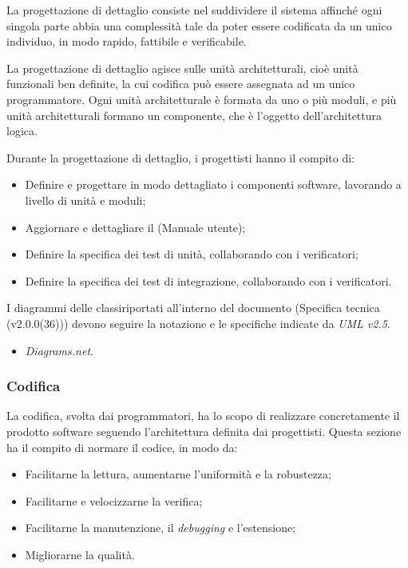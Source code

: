 \documentclass[10pt, a4paper]{article}
\begin{document}
\label{sec:progettazione_di_dettaglio}
La progettazione di dettaglio consiste nel suddividere il sistema affinché ogni singola parte abbia una complessità tale da poter essere codificata da un unico individuo, in modo rapido, fattibile e verificabile.


La progettazione di dettaglio agisce sulle unità architetturali, cioè unità funzionali ben definite, la cui codifica può essere assegnata ad un unico programmatore.
Ogni unità architetturale è formata da uno o più moduli, e più unità architetturali formano un componente, che è l'oggetto dell'architettura logica.

Durante la progettazione di dettaglio, i progettisti hanno il compito di:
\begin{itemize}
    \item Definire e progettare in modo dettagliato i componenti software, lavorando a livello di unità e moduli;
    \item Aggiornare e dettagliare il (Manuale utente);
    \item Definire la specifica dei test di unità, collaborando con i verificatori;
    \item Definire la specifica dei test di integrazione, collaborando con i verificatori.
\end{itemize}

I diagrammi delle classiriportati all'interno del documento (Specifica tecnica (v2.0.0(36))) devono seguire la notazione e le specifiche indicate da \textit{UML v2.5}.

\begin{itemize}
    \item \textit{Diagrams.net}.
\end{itemize}


\subsubsection{Codifica}
La codifica, svolta dai programmatori, ha lo scopo di realizzare concretamente il prodotto software seguendo l'architettura definita dai progettisti.
Questa sezione ha il compito di normare il codice, in modo da:
\begin{itemize}
    \item Facilitarne la lettura, aumentarne l'uniformità e la robustezza;
    \item Facilitarne e velocizzarne la verifica;
    \item Facilitarne la manutenzione, il \textit{debugging\pg} e l'estensione;
    \item Migliorarne la qualità.
\end{itemize}
\end{document}
